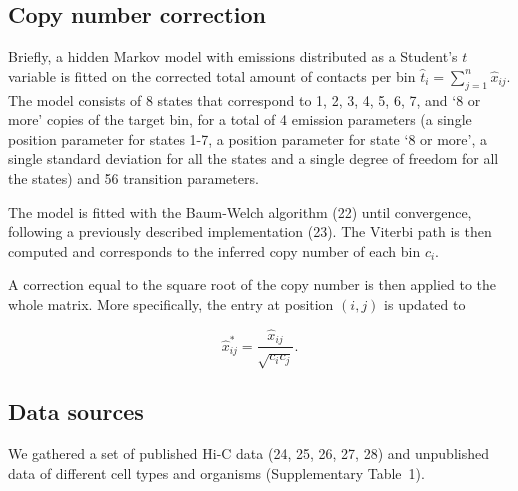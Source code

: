 \documentclass[a4,center,fleqn]{NAR}
\providecommand{\DIFadd}[1]{{\protect\color{red}#1}} %
\providecommand{\DIFdel}[1]{{\protect}}                      %
\providecommand{\DIFaddbegin}{} %
\providecommand{\DIFaddend}{} %
\providecommand{\DIFdelbegin}{} %
\providecommand{\DIFdelend}{} %
\begin{document}
\subsection{Copy number correction}
\DIFdelbegin %
\DIFdelend 

Briefly, a hidden Markov model with emissions distributed as a Student's
$t$ variable is fitted on the corrected total amount of contacts per bin
\DIFdelbegin \DIFdel{($\lambda_i'$)}\DIFdelend \DIFaddbegin \DIFadd{$\hat{t}_i = \sum_{j=1}^n{\hat{x}_{ij}}$}\DIFaddend . The model consists of \DIFdelbegin \DIFdel{7 }\DIFdelend \DIFaddbegin \DIFadd{8
}\DIFaddend states that correspond to 1, 2, 3, 4, 5, 6\DIFdelbegin \DIFdel{and }\DIFdelend \DIFaddbegin \DIFadd{, 7, and `}\DIFaddend 8 \DIFaddbegin \DIFadd{or more' }\DIFaddend copies of
the target \DIFaddbegin \DIFadd{bin}\DIFaddend , for a total of \DIFdelbegin \DIFdel{3 }\DIFdelend \DIFaddbegin \DIFadd{4 }\DIFaddend emission parameters (a single \DIFdelbegin \DIFdel{scaling parameter , a }\DIFdelend \DIFaddbegin \DIFadd{position
parameter for states 1-7, a position parameter for state `8 or more', a
}\DIFaddend single standard deviation \DIFaddbegin \DIFadd{for all the states }\DIFaddend and a single degree of
freedom for all the states) and \DIFdelbegin \DIFdel{21 }\DIFdelend \DIFaddbegin \DIFadd{56 }\DIFaddend transition parameters. 

The model is fitted with the Baum-Welch algorithm (22) until
convergence, following a previously described implementation
(23).  The Viterbi path is then computed and
corresponds to the inferred copy number of each bin \DIFdelbegin \DIFdel{(}\DIFdelend $c_i$\DIFdelbegin \DIFdel{)}\DIFdelend .

A correction equal to the square root of the copy number is then applied
to the whole matrix. More specifically, \DIFdelbegin \DIFdel{each cell }\DIFdelend \DIFaddbegin \DIFadd{the entry at position $(i,j)$ }\DIFaddend is
updated to
\DIFdelbegin %

\DIFdelend \begin{equation}
\label{eq:cnvnorm}
\hat{x}_{ij}^* = \frac{\hat{x}_{ij}}{\sqrt{c_ic_j}}.
\end{equation}


\subsection{Data sources}

\DIFdelbegin \DIFdel{To test the correction of biases, we }\DIFdelend \DIFaddbegin \DIFadd{We }\DIFaddend gathered a set of published \DIFaddbegin \DIFadd{Hi-C data }\DIFaddend (24, 25, 26, 27, 28\DIFdelbegin \DIFdel{, 29}\DIFdelend ) and unpublished \DIFdelbegin \DIFdel{Hi-C }\DIFdelend data of
different cell types and organisms (\DIFdelbegin \DIFdel{Table \ref{tab:samples}}\DIFdelend \DIFaddbegin \DIFadd{Supplementary Table~1}\DIFaddend ).
\end{document}
